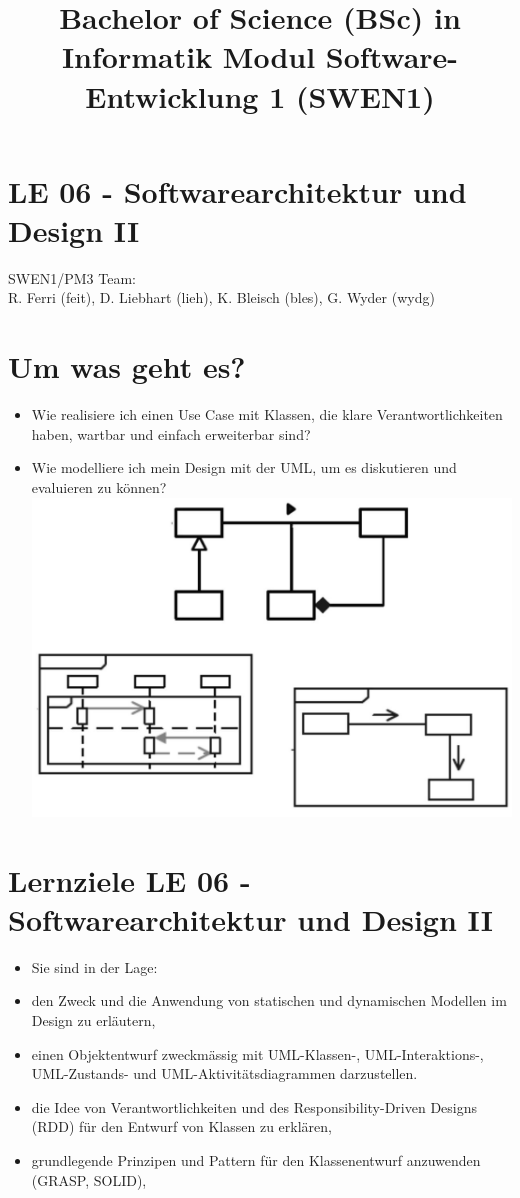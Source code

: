 \documentclass[10pt]{article}
\title{Bachelor of Science (BSc) in Informatik Modul Software-Entwicklung 1 (SWEN1) }
\author{}
\date{}
\begin{document}
\maketitle
\section*{LE 06 - Softwarearchitektur und Design II}
SWEN1/PM3 Team:\\
R. Ferri (feit), D. Liebhart (lieh), K. Bleisch (bles), G. Wyder (wydg)

\section*{Um was geht es?}
\begin{itemize}
  \item Wie realisiere ich einen Use Case mit Klassen, die klare Verantwortlichkeiten haben, wartbar und einfach erweiterbar sind?
  \item Wie modelliere ich mein Design mit der UML, um es diskutieren und evaluieren zu können?\\
\includegraphics[max width=\textwidth, center]{2025_01_02_787afb9584031d2940deg-02}
\end{itemize}

\section*{Lernziele LE 06 - Softwarearchitektur und Design II}
\begin{itemize}
  \item Sie sind in der Lage:
  \item den Zweck und die Anwendung von statischen und dynamischen Modellen im Design zu erläutern,
  \item einen Objektentwurf zweckmässig mit UML-Klassen-, UML-Interaktions-, UML-Zustands- und UML-Aktivitätsdiagrammen darzustellen.
  \item die Idee von Verantwortlichkeiten und des Responsibility-Driven Designs (RDD) für den Entwurf von Klassen zu erklären,
  \item grundlegende Prinzipen und Pattern für den Klassenentwurf anzuwenden (GRASP, SOLID),
\end{itemize}
\end{document}

